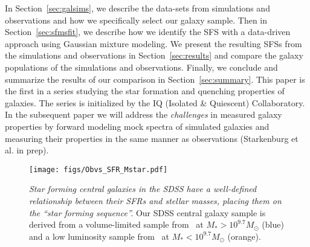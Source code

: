 \documentclass[tighten, preprint]{aastex62}
\newcommand{\todo}[1]{{\bf \textcolor{red}{ #1}}}
\begin{document}
In Section~\ref{sec:galsims}, we describe the data-sets from simulations
and observations and how we specifically select our galaxy sample. 
Then in Section~\ref{sec:sfmsfit}, we describe 
{\color{red} how we identify the SFS with a data-driven approach using 
Gaussian mixture modeling}. We present 
{\color{red} the resulting SFSs from the simulations and observations} 
in Section~\ref{sec:results} and compare the galaxy populations
of the simulations and observations. Finally, we conclude and summarize
the results of our comparison in Section~\ref{sec:summary}.
This paper is the first in a series studying the star formation and 
quenching properties of galaxies. The series is initialized by the 
IQ (Isolated \& Quiescent) Collaboratory. %
In the subsequent paper we will address the \emph{challenges} in measured galaxy properties by 
{\color{red} forward modeling mock spectra of simulated galaxies and 
measuring their properties in the same manner as observations (Starkenburg et al. in prep).}

\begin{figure}
\begin{center}
\texttt{[image: figs/Obvs\_SFR\_Mstar.pdf]} 
\caption{\color{red} \emph{Star forming central galaxies in the SDSS 
have a well-defined relationship between their SFRs and stellar masses, 
placing them on the ``star forming sequence''.} Our SDSS central galaxy 
sample is derived from a volume-limited sample from~\cite{tinker2011} 
at $M_* > 10^{9.7} M_\odot$ (blue) and a low luminosity sample 
from~\cite{geha2012} at $M_* < 10^{9.7} M_\odot$ (orange).}
\label{fig:sfrmstar_sdss}
\end{center}
\end{figure}
\end{document}
